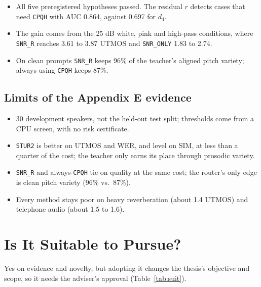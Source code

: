 \documentclass[11pt,a4paper]{article}
\newcommand{\snrr}{\texttt{SNR\_R}}
\begin{document}
\begin{itemize}[leftmargin=1.3em]
\item All five preregistered hypotheses passed. The residual $r$ detects cases that need \texttt{CPQH} with AUC 0.864, against 0.697 for $d_4$.
\item The gain comes from the 25 dB white, pink and high-pass conditions, where \snrr{} reaches 3.61 to 3.87 UTMOS and \texttt{SNR\_ONLY} 1.83 to 2.74.
\item On clean prompts \snrr{} keeps 96\% of the teacher's aligned pitch variety; always using \texttt{CPQH} keeps 87\%.
\end{itemize}

\subsection*{Limits of the Appendix E evidence}
\begin{itemize}[leftmargin=1.3em]
\item 30 development speakers, not the held-out test split; thresholds come from a CPU screen, with no risk certificate.
\item \texttt{STUR2} is better on UTMOS and WER, and level on SIM, at less than a quarter of the cost; the teacher only earns its place through prosodic variety.
\item \snrr{} and always-\texttt{CPQH} tie on quality at the same cost; the router's only edge is clean pitch variety (96\% vs.\ 87\%).
\item Every method stays poor on heavy reverberation (about 1.4 UTMOS) and telephone audio (about 1.5 to 1.6).
\end{itemize}

\section{Is It Suitable to Pursue?}

Yes on evidence and novelty, but adopting it changes the thesis's objective and scope, so it needs the adviser's approval (Table~\ref{tab:suit}).
\end{document}
